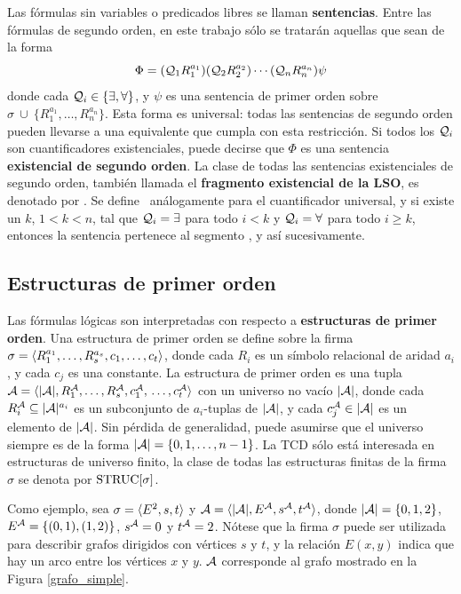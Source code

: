 Las fórmulas sin variables o predicados libres se llaman \textbf{sentencias}.
Entre las fórmulas de segundo orden, en este trabajo
sólo se tratarán aquellas que sean de la forma
\[ \Phi = (\mathcal{Q}_1R_1^{a_1})(\mathcal{Q}_2R_2^{a_2})\cdots(\mathcal{Q}_nR_n^{a_n})\psi \]
donde cada $\mathcal{Q}_i \in \{\exists,\forall\}$, y
$\psi$ es una sentencia de primer orden sobre $\sigma\ \cup\ \{R_1^{a_1},\ldots,R_n^{a_n}\}$.
Esta forma es universal: todas las sentencias de segundo orden pueden llevarse
a una equivalente que cumpla con esta restricción.
Si todos los $\mathcal{Q}_i$ son cuantificadores existenciales, puede decirse que
$\Phi$ es una sentencia \textbf{existencial de segundo orden}.
La clase de todas las sentencias existenciales de segundo orden, también
llamada el \textbf{fragmento existencial de la LSO}, es denotado por \SOE. Se
define \SOA\ análogamente para el cuantificador universal,
y si existe un $k$, $1<k<n$, tal que $\mathcal{Q}_i=\exists$ para todo $i<k$
y $\mathcal{Q}_i=\forall$ para todo $i\geq k$, entonces la sentencia
pertenece al segmento \SOEA, y así sucesivamente.

\subsection{Estructuras de primer orden}
Las fórmulas lógicas son interpretadas con respecto a \textbf{estructuras de primer
orden}. Una estructura de primer orden se define sobre la firma
$\sigma=\langle R_1^{a_1},\ldots,R_s^{a_s},\\c_1,\ldots,c_t \rangle$, donde cada $R_i$ es
un símbolo relacional de aridad $a_i$, y cada $c_j$ es una constante. 
La estructura de primer orden es una tupla
$\mathcal{A}=\langle |\mathcal{A}|,R_1^{\mathcal{A}},\ldots,R_s^{\mathcal{A}},c_1^{\mathcal{A}},\\\ldots,c_t^{\mathcal{A}} \rangle$ con un universo
no vacío $|\mathcal{A}|$, donde cada $R_i^{\mathcal{A}}\subseteq|\mathcal{A}|^{a_i}$ es un subconjunto de
$a_i$-tuplas de $|\mathcal{A}|$, y cada
$c_j^{\mathcal{A}}\in|\mathcal{A}|$ es un elemento de $|\mathcal{A}|$.
Sin pérdida de generalidad, puede asumirse que el universo siempre es de la
forma $|\mathcal{A}|=\{0,1,\ldots,n-1\}$.
La TCD sólo está interesada en estructuras de universo finito, la clase de
todas las estructuras finitas de la firma $\sigma$ se denota por $\text{STRUC}[\sigma]$.

Como ejemplo, sea $\sigma=\langle E^2,s,t \rangle$ y
$\mathcal{A}=\langle |\mathcal{A}|,E^{\mathcal{A}},s^{\mathcal{A}},t^{\mathcal{A}} \rangle$, donde $|\mathcal{A}|=\{0,1,2\}$,
$E^{\mathcal{A}}=\{(0,1),(1,2)\}$, $s^{\mathcal{A}}=0$ y $t^{\mathcal{A}}=2$.
Nótese que la firma $\sigma$ puede ser utilizada para describir grafos
dirigidos con vértices $s$ y $t$, y la relación $E(x, y)$ indica que hay un
arco entre los vértices $x$ y $y$. $\mathcal{A}$ corresponde al grafo mostrado en la
Figura \ref{grafo_simple}.


